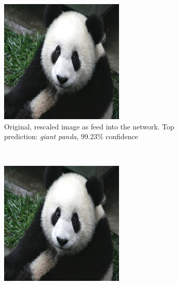 \documentclass[11pt, a4paper]{article}
\begin{document}
\begin{figure}[htp]
    \centering
    \begin{subfigure}[b]{0.45\textwidth}
        \includegraphics[width=\textwidth]{aes_new/panda.png}
        \caption{Original, rescaled image as feed into the network. Top prediction: \emph{giant panda}, 99.23\% confidence}
        \label{fig:ae-example-original}
    \end{subfigure}
    ~ %
    \begin{subfigure}[b]{0.45\textwidth}
        \includegraphics[width=\textwidth]{aes_new/panda_acorn_10_0dot9.png}

\end{subfigure}
\end{figure}
\end{document}
